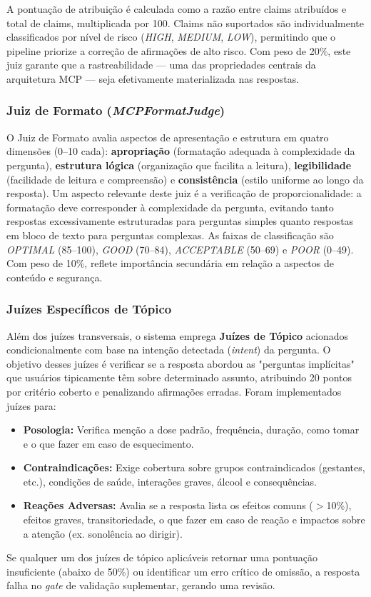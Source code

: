 \documentclass[12pt]{article}
\begin{document}
A pontuação de atribuição é calculada como a razão entre claims atribuídos e total de claims, multiplicada por 100. Claims não suportados são individualmente classificados por nível de risco (\textit{HIGH}, \textit{MEDIUM}, \textit{LOW}), permitindo que o pipeline priorize a correção de afirmações de alto risco. Com peso de 20\%, este juiz garante que a rastreabilidade --- uma das propriedades centrais da arquitetura MCP --- seja efetivamente materializada nas respostas.

\subsubsection{Juiz de Formato (\textit{MCPFormatJudge})}

O Juiz de Formato avalia aspectos de apresentação e estrutura em quatro dimensões (0--10 cada): \textbf{apropriação} (formatação adequada à complexidade da pergunta), \textbf{estrutura lógica} (organização que facilita a leitura), \textbf{legibilidade} (facilidade de leitura e compreensão) e \textbf{consistência} (estilo uniforme ao longo da resposta). Um aspecto relevante deste juiz é a verificação de proporcionalidade: a formatação deve corresponder à complexidade da pergunta, evitando tanto respostas excessivamente estruturadas para perguntas simples quanto respostas em bloco de texto para perguntas complexas. As faixas de classificação são \textit{OPTIMAL} (85--100), \textit{GOOD} (70--84), \textit{ACCEPTABLE} (50--69) e \textit{POOR} (0--49). Com peso de 10\%, reflete importância secundária em relação a aspectos de conteúdo e segurança.

\subsubsection{Juízes Específicos de Tópico}

Além dos juízes transversais, o sistema emprega \textbf{Juízes de Tópico} acionados condicionalmente com base na intenção detectada (\textit{intent}) da pergunta. O objetivo desses juízes é verificar se a resposta abordou as "perguntas implícitas" que usuários tipicamente têm sobre determinado assunto, atribuindo 20 pontos por critério coberto e penalizando afirmações erradas. Foram implementados juízes para:
\begin{itemize}
    \item \textbf{Posologia:} Verifica menção a dose padrão, frequência, duração, como tomar e o que fazer em caso de esquecimento.
    \item \textbf{Contraindicações:} Exige cobertura sobre grupos contraindicados (gestantes, etc.), condições de saúde, interações graves, álcool e consequências.
    \item \textbf{Reações Adversas:} Avalia se a resposta lista os efeitos comuns ($>$10\%), efeitos graves, transitoriedade, o que fazer em caso de reação e impactos sobre a atenção (ex. sonolência ao dirigir).
\end{itemize}
Se qualquer um dos juízes de tópico aplicáveis retornar uma pontuação insuficiente (abaixo de 50\%) ou identificar um erro crítico de omissão, a resposta falha no \textit{gate} de validação suplementar, gerando uma revisão.
\end{document}
